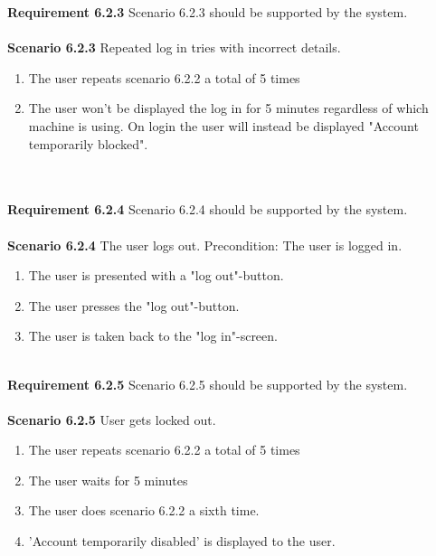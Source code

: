 \documentclass{article}
\begin{document}
\textbf{Requirement 6.2.3} Scenario 6.2.3 should be supported by the system.
\\ \\
\textbf{Scenario 6.2.3} Repeated log in tries with incorrect details.
\begin{enumerate}
    \item The user repeats scenario 6.2.2 a total of 5 times
    \item The user won't be displayed the log in for 5 minutes regardless of which machine is using. On login the user will instead be displayed "Account temporarily blocked".
\end{enumerate}
\mbox{}\\ \\
\textbf{Requirement 6.2.4} Scenario 6.2.4 should be supported by the system.
\\ \\
\textbf{Scenario 6.2.4} The user logs out. Precondition: The user is logged in.
\begin{enumerate}
    \item The user is presented with a "log out"-button.
    \item The user presses the "log out"-button.
    \item The user is taken back to the "log in"-screen.
\end{enumerate}
\mbox{}\\
\textbf{Requirement 6.2.5} Scenario 6.2.5 should be supported by the system.
\\ \\
\textbf{Scenario 6.2.5} User gets locked out.
\begin{enumerate}
    \item The user repeats scenario 6.2.2 a total of 5 times
    \item The user waits for 5 minutes
    \item The user does scenario 6.2.2 a sixth time.
    \item 'Account temporarily disabled' is displayed to the user.
\end{enumerate}
\end{document}
